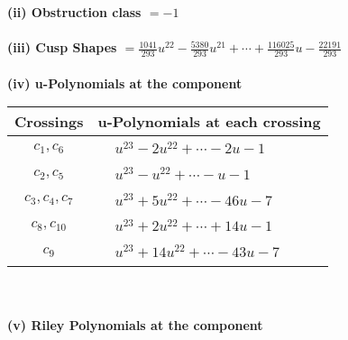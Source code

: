 \documentclass[1p]{elsarticle_modified}
\theoremstyle{definition}
\begin{document}
\flushleft \textbf{(ii) Obstruction class $= -1$}\\~\\
\flushleft \textbf{(iii) Cusp Shapes $= \frac{1041}{293} u^{22}-\frac{5380}{293} u^{21}+\cdots+\frac{116025}{293} u-\frac{22191}{293}$}\\~\\
\newpage\renewcommand{\arraystretch}{1}
\flushleft \textbf{(iv) u-Polynomials at the component}\newline \\
\begin{tabular}{m{50pt}|m{274pt}}
Crossings & \hspace{64pt}u-Polynomials at each crossing \\
\hline $$\begin{aligned}c_{1},c_{6}\end{aligned}$$&$\begin{aligned}
&u^{23}-2 u^{22}+\cdots-2 u-1
\end{aligned}$\\
\hline $$\begin{aligned}c_{2},c_{5}\end{aligned}$$&$\begin{aligned}
&u^{23}- u^{22}+\cdots- u-1
\end{aligned}$\\
\hline $$\begin{aligned}c_{3},c_{4},c_{7}\end{aligned}$$&$\begin{aligned}
&u^{23}+5 u^{22}+\cdots-46 u-7
\end{aligned}$\\
\hline $$\begin{aligned}c_{8},c_{10}\end{aligned}$$&$\begin{aligned}
&u^{23}+2 u^{22}+\cdots+14 u-1
\end{aligned}$\\
\hline $$\begin{aligned}c_{9}\end{aligned}$$&$\begin{aligned}
&u^{23}+14 u^{22}+\cdots-43 u-7
\end{aligned}$\\
\hline
\end{tabular}\\~\\
\newpage\renewcommand{\arraystretch}{1}
\flushleft \textbf{(v) Riley Polynomials at the component}\newline \\
\end{document}
